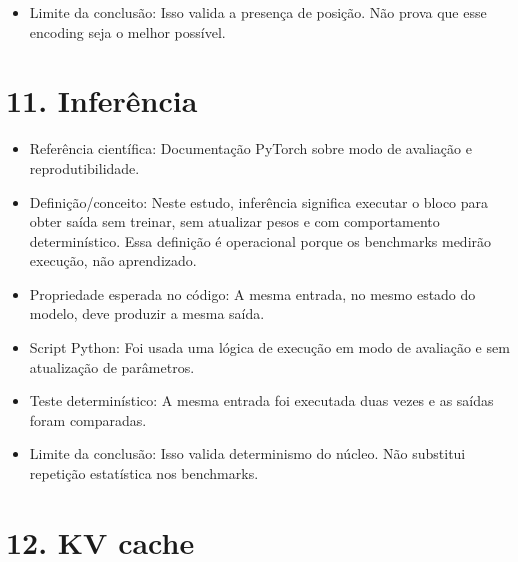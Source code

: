 \begin{itemize}
\item Limite da conclusão:
Isso valida a presença de posição. Não prova que esse encoding seja o melhor
possível.
\end{itemize}



\section{11. Inferência}


\begin{itemize}
\item Referência científica:
Documentação PyTorch sobre modo de avaliação e reprodutibilidade.
\end{itemize}

\begin{itemize}
\item Definição/conceito:
Neste estudo, inferência significa executar o bloco para obter saída sem
treinar, sem atualizar pesos e com comportamento determinístico. Essa definição
é operacional porque os benchmarks medirão execução, não aprendizado.
\end{itemize}

\begin{itemize}
\item Propriedade esperada no código:
A mesma entrada, no mesmo estado do modelo, deve produzir a mesma saída.
\end{itemize}

\begin{itemize}
\item Script Python:
Foi usada uma lógica de execução em modo de avaliação e sem atualização de
parâmetros.
\end{itemize}

\begin{itemize}
\item Teste determinístico:
A mesma entrada foi executada duas vezes e as saídas foram comparadas.
\end{itemize}

\begin{itemize}
\item Limite da conclusão:
Isso valida determinismo do núcleo. Não substitui repetição estatística nos
benchmarks.
\end{itemize}



\section{12. KV cache}


